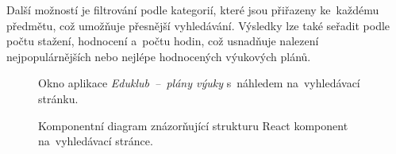 \documentclass[male,czech,api_bc]{kitheses}
\begin{document}
Další možností je filtrování podle kategorií, které jsou přiřazeny ke~každému předmětu, což umožňuje přesnější vyhledávání. Výsledky lze také seřadit podle počtu stažení, hodnocení a~počtu hodin, což usnadňuje nalezení nejpopulárnějších nebo nejlépe hodnocených výukových plánů.

\begin{figure}[H]
	\centering
	\caption{Okno aplikace \textit{Eduklub~--~plány výuky} s~náhledem na~vyhledávací stránku.}
	\label{fig:eduklub-3}
\end{figure}

\begin{figure}[H]
	\centering
	\caption{Komponentní diagram znázorňující strukturu React komponent na~vyhledávací stránce.}
	\label{fig:component-diagram-react-3}
\end{figure}
\end{document}
